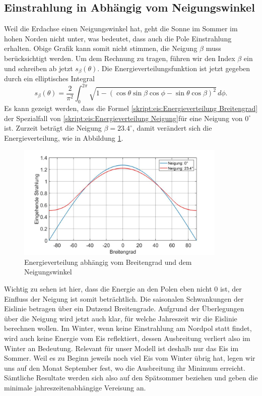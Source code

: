 \begin{refsection}
\subsection{Einstrahlung in Abhängig vom Neigungswinkel}
Weil die Erdachse einen Neigungswinkel hat, geht die Sonne im Sommer im hohen Norden nicht unter, was bedeutet, dass auch die Pole Einstrahlung erhalten. Obige Grafik kann somit nicht stimmen, die Neigung $\beta$ muss berücksichtigt werden. Um dem Rechnung zu tragen, führen wir den Index $\beta$ ein und schreiben ab jetzt $s_{\beta}(\theta)$. Die Energieverteilungsfunktion ist jetzt gegeben durch ein elliptisches Integral
\begin{equation}\label{skript:eis:Energieverteilung Neigung}
s_{\beta}(\theta)
=
\frac{2}{\pi^2}\int_{0}^{2\pi}\sqrt{1-(\cos\theta\sin\beta \cos\phi-\sin\theta \cos\beta)^2}\,d\phi.
\end{equation}
Es kann gezeigt werden, dass die Formel \eqref{skript:eis:Energieverteilung Breitengrad} der Spezialfall von \eqref{skript:eis:Energieverteilung Neigung}für eine Neigung von $0^{\circ}$ ist. Zurzeit beträgt die Neigung $\beta=23.4^{\circ}$, damit verändert sich die Energieverteilung, wie in Abbildung \ref{skript:eis:fig:Einstrahlung_abh_mit_und_ohne_Neigung}.
\begin{figure}
	\centering
	\includegraphics[width=10cm]{eis/Einstrahlung_abh_mit_und_ohne_Neigung.jpg}
	\caption{Energieverteilung abhängig vom Breitengrad und dem Neigungswinkel}
	\label{skript:eis:fig:Einstrahlung_abh_mit_und_ohne_Neigung}
\end{figure}
Wichtig zu sehen ist hier, dass die Energie an den Polen eben nicht $0$ ist, der Einfluss der Neigung ist somit beträchtlich. Die saisonalen Schwankungen der Eislinie betragen über ein Dutzend Breitengrade. Aufgrund der Überlegungen über die Neigung wird jetzt auch klar, für welche Jahreszeit wir die Eislinie berechnen wollen. Im Winter, wenn keine Einstrahlung am Nordpol statt findet, wird auch keine Energie vom Eis reflektiert, dessen Ausbreitung verliert also im Winter an Bedeutung. Relevant für unser Modell ist deshalb nur das Eis im Sommer. Weil es zu Beginn jeweils noch viel Eis vom Winter übrig hat, legen wir uns auf den Monat September fest, wo die Ausbreitung ihr Minimum erreicht. Sämtliche Resultate werden sich also auf den Spätsommer beziehen und geben die minimale jahreszeitenabhängige Vereisung an.

\end{refsection}
